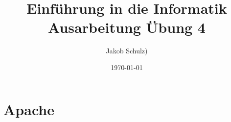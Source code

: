 \documentclass[a4paper,11pt,titlepage]{article}
\begin{document}
\title{Einf\"uhrung in die Informatik\\
Ausarbeitung \"Ubung 4}


\author{Jakob Schulz)}


\date{\today}

\maketitle{\thispagestyle{plain}}

\section{Apache}
\end{document}

